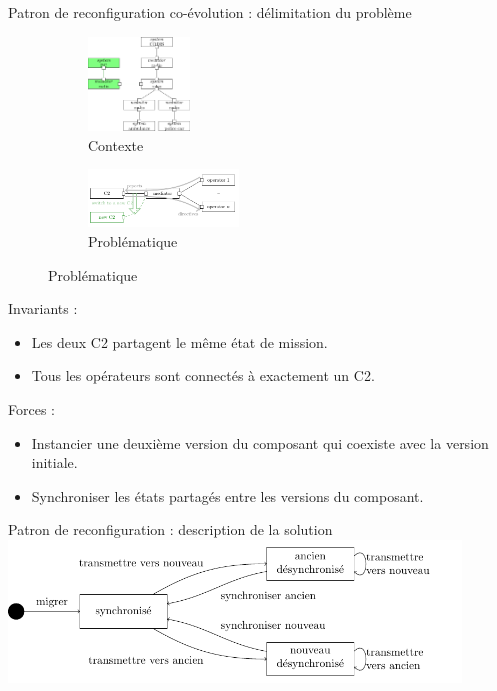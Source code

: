 \begin{frame}{Patron de reconfiguration co-évolution : délimitation du problème}
\begin{figure}
\begin{subfigure}[b]{0.4\textwidth}
\includegraphics[height=2.5cm]{imgs/fig_rearchitecture}
\caption{Contexte}
\end{subfigure}
\begin{subfigure}[b]{0.4\textwidth}
\includegraphics[width=4cm]{imgs/dc_archi-C2}
\caption{Problématique}
\end{subfigure}
\end{figure}

Invariants :
\begin{itemize}
\item Les deux C2 partagent le même état de mission.
\item Tous les opérateurs sont connectés à exactement un
C2. 
\end{itemize}

Forces :
\begin{itemize}
\item Instancier une deuxième version du composant qui coexiste avec
la version initiale.
\item Synchroniser les états partagés entre les versions du
composant.
\end{itemize}

\end{frame}

\begin{frame}{Patron de reconfiguration : description de la solution}
\includegraphics[width=12cm]{imgs/slide_solution_coevolution.pdf}
\end{frame}

